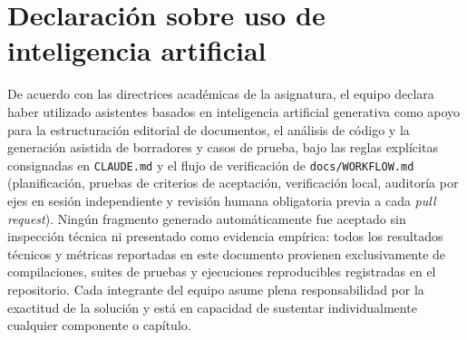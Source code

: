 \documentclass[12pt,a4paper]{article}
\begin{document}
\section*{Declaración sobre uso de inteligencia artificial}

De acuerdo con las directrices académicas de la asignatura, el equipo declara haber utilizado asistentes basados en inteligencia artificial generativa como apoyo para la estructuración editorial de documentos, el análisis de código y la generación asistida de borradores y casos de prueba, bajo las reglas explícitas consignadas en \texttt{CLAUDE.md} y el flujo de verificación de \texttt{docs/WORKFLOW.md} (planificación, pruebas de criterios de aceptación, verificación local, auditoría por ejes en sesión independiente y revisión humana obligatoria previa a cada \textit{pull request}). Ningún fragmento generado automáticamente fue aceptado sin inspección técnica ni presentado como evidencia empírica: todos los resultados técnicos y métricas reportadas en este documento provienen exclusivamente de compilaciones, suites de pruebas y ejecuciones reproducibles registradas en el repositorio. Cada integrante del equipo asume plena responsabilidad por la exactitud de la solución y está en capacidad de sustentar individualmente cualquier componente o capítulo.
\end{document}
